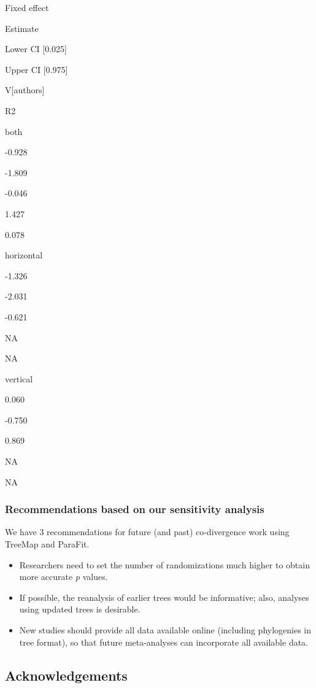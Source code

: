 \documentclass[
]{article}
\begin{document}
Fixed effect

Estimate

Lower CI {[}0.025{]}

Upper CI {[}0.975{]}

V{[}authors{]}

R2

both

-0.928

-1.809

-0.046

1.427

0.078

horizontal

-1.326

-2.031

-0.621

NA

NA

vertical

0.060

-0.750

0.869

NA

NA

\hypertarget{recommendations-based-on-our-sensitivity-analysis}{%
\subsubsection{Recommendations based on our sensitivity
analysis}\label{recommendations-based-on-our-sensitivity-analysis}}

We have 3 recommendations for future (and past) co-divergence work using
TreeMap and ParaFit.

\begin{itemize}
\item
  Researchers need to set the number of randomizations much higher to
  obtain more accurate \emph{p} values.
\item
  If possible, the reanalysis of earlier trees would be informative;
  also, analyses using updated trees is desirable.
\item
  New studies should provide all data available online (including
  phylogenies in tree format), so that future meta-analyses can
  incorporate all available data.
\end{itemize}

\hypertarget{acknowledgements}{%
\subsection{Acknowledgements}\label{acknowledgements}}
\end{document}
